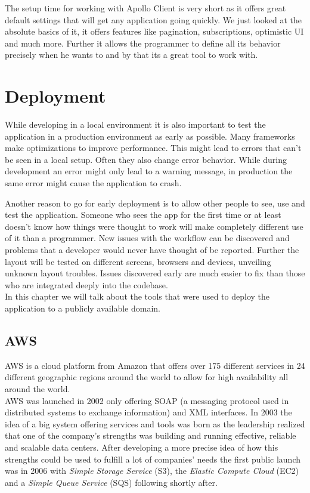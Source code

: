 The setup time for working with Apollo Client is very short as it offers great default settings that will get any application going quickly. We just looked at the absolute basics of it, it offers features like pagination, subscriptions, optimistic UI and much more.
Further it allows the programmer to define all its behavior precisely when he wants to and by that its a great tool to work with.

\chapter{Deployment}

While developing in a local environment it is also important to test the application in a production environment as early as possible. Many frameworks make optimizations to improve performance. This might lead to errors that can't be seen in a local setup. Often they also change error behavior. While during development an error might only lead to a warning message, in production the same error might cause the application to crash.

Another reason to go for early deployment is to allow other people to see, use and test the application. Someone who sees the app for the first time or at least doesn't know how things were thought to work will make completely different use of it than a programmer. New issues with the workflow can be discovered and problems that a developer would never have thought of be reported. Further the layout will be tested on different screens, browsers and devices, unveiling unknown layout troubles. Issues discovered early are much easier to fix than those who are integrated deeply into the codebase. \\

In this chapter we will talk about the tools that were used to deploy the application to a publicly available domain.

\section{AWS}
AWS is a cloud platform from Amazon that offers over 175 different services in 24 different geographic regions around the world to allow for high availability all around the world. \cite{WhatIsAws}\\
AWS was launched in 2002 only offering SOAP (a messaging protocol used in distributed systems to exchange information) and XML interfaces. \cite{HistoryAwsMedia} In 2003 the idea of a big system offering services and tools was born as the leadership realized that one of the company's strengths was building and running effective, reliable and scalable data centers. After developing a more precise idea of how this strengths could be used to fulfill a lot of companies' needs the first public launch was in 2006 with \emph{Simple Storage Service} (S3), the \emph{Elastic Compute Cloud} (EC2) and a \emph{Simple Queue Service} (SQS) following shortly after. \cite{HistoryAwsTech}

